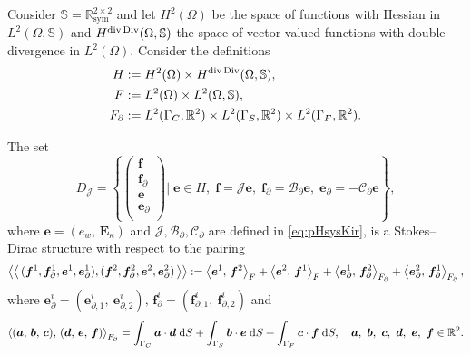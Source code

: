 \begin{conjecture}\label{conj:stdirKir}
	Consider $\mathbb{S} = \mathbb{R}^{2\times 2}_{\text{sym}}$ and
	let $H^{2}(\Omega)$ be the space of functions with Hessian in $L^2(\Omega, \mathbb{S})$ and $H^{\div\Div}  (\Omega, \mathbb{S})$ the space of vector-valued functions with double divergence in $L^2(\Omega)$. Consider the definitions
	\begin{align*}
	H &:=H^{2}(\Omega) \times H^{\div\Div}(\Omega, \mathbb{S}), \\
	F &:= L^2(\Omega) \times L^2(\Omega, \mathbb{S}), \\
	F_\partial &:= L^2(\Gamma_C, \mathbb{R}^2) \times L^2(\Gamma_S, \mathbb{R}^2) \times L^2(\Gamma_F, \mathbb{R}^2). 
	\end{align*}
	
	The set 
	\begin{equation}
	{D}_{\mathcal{J}} = \left\{
	\begin{pmatrix}
	\bm{f} \\ \bm{f}_\partial \\ \bm{e} \\ \bm{e}_\partial \\
	\end{pmatrix}
	\vert \;
	\bm{e} \in H, \; \bm{f} = \mathcal{J} \bm{e}, \;\bm{f}_\partial = \mathcal{B}_\partial \bm{e}, \; \bm{e}_\partial = -\mathcal{C}_\partial \bm{e}   \right\},
	\end{equation}
	where $\bm{e} = ({e}_w, \, \bm{E}_\kappa)$ and $\mathcal{J, B_\partial, C_\partial}$ are defined in \eqref{eq:pHsysKir}, is a Stokes–Dirac structure with respect to the pairing
	\begin{equation}\label{eq:bilinearKir}
	\bilprod{(\bm{f}^1, \bm{f}_{\partial}^1, \bm{e}^1, \bm{e}_{\partial}^1)}{(\bm{f}^2, \bm{f}_{\partial}^2, \bm{e}^2, \bm{e}_{\partial}^2)}  := \inner[F]{\bm{e}^1}{\bm{f}^2} + \inner[F]{\bm{e}^2}{\bm{f}^1} + \inner[F_\partial]{\bm{e}_{\partial}^1}{\bm{f}_{\partial}^2} + \inner[F_\partial]{\bm{e}_{\partial}^2}{\bm{f}_{\partial}^1},
	\end{equation}
	where $\bm{e}_{\partial}^i = (\bm{e}_{\partial, 1}^i, \ \bm{e}_{\partial, 2}^i), \, \bm{f}_{\partial}^i = (\bm{f}_{\partial, 1}^i, \ \bm{f}_{\partial, 2}^i)$ and
	\begin{equation*}
	\inner[F_\partial]{(\bm{a}, \, \bm{b}, \, \bm{c})}{(\bm{d}, \, \bm{e}, \, \bm{f})} = \int_{\Gamma_C} \bm{a} \cdot \bm{d} \d{S} + \int_{\Gamma_S} \bm{b} \cdot \bm{e} \d{S}  + \int_{\Gamma_F} \bm{c} \cdot \bm{f} \d{S}, \quad \bm{a},\ \bm{b},\ \bm{c},\ \bm{d},\ \bm{e},\ \bm{f} \in \mathbb{R}^2. 
	\end{equation*}
	
\end{conjecture}

